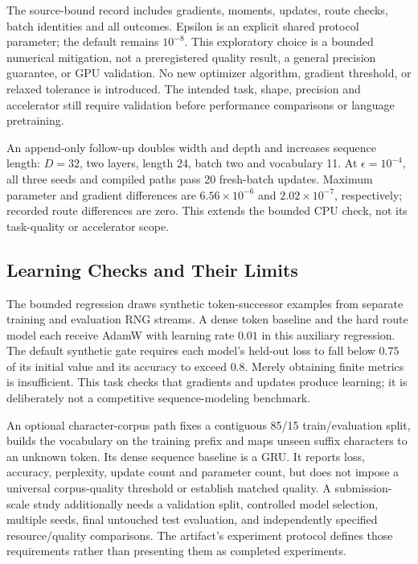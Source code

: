 The source-bound record includes gradients, moments, updates, route checks,
batch identities and all outcomes. Epsilon is an explicit shared protocol
parameter; the default remains $10^{-8}$. This exploratory choice is a
bounded numerical mitigation, not a preregistered quality result, a general
precision guarantee, or GPU validation. No new optimizer algorithm,
gradient threshold, or relaxed tolerance is introduced. The intended
task, shape, precision and accelerator still require validation before
performance comparisons or language pretraining.

An append-only follow-up doubles width and depth and increases sequence
length: $D=32$, two layers, length 24, batch two and vocabulary 11. At
$\epsilon=10^{-4}$, all three seeds and compiled paths pass 20 fresh-batch
updates. Maximum parameter and gradient differences are
$6.56\times10^{-6}$ and $2.02\times10^{-7}$, respectively; recorded route
differences are zero. This extends the bounded CPU check, not its
task-quality or accelerator scope.

\subsection{Learning Checks and Their Limits}

The bounded regression draws synthetic token-successor examples from
separate training and evaluation RNG streams. A dense token baseline and
the hard route model each receive AdamW with learning rate $0.01$ in this
auxiliary regression. The default synthetic gate requires each model's
held-out loss to fall below $0.75$ of its initial value and its accuracy to
exceed $0.8$. Merely obtaining finite metrics is insufficient. This task
checks that gradients and updates produce learning; it is deliberately not
a competitive sequence-modeling benchmark.

An optional character-corpus path fixes a contiguous 85/15 train/evaluation
split, builds the vocabulary on the training prefix and maps unseen suffix
characters to an unknown token. Its dense sequence baseline is a GRU. It
reports loss, accuracy, perplexity, update count and parameter count, but
does not impose a universal corpus-quality threshold or establish matched
quality. A submission-scale study additionally needs a validation split,
controlled model selection, multiple seeds, final untouched test evaluation,
and independently specified resource/quality comparisons. The artifact's
experiment protocol defines those requirements rather than presenting them
as completed experiments.

